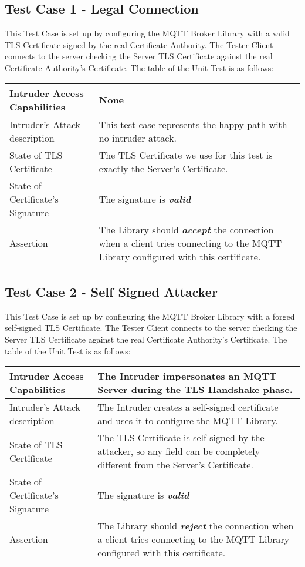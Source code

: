\documentclass[binding=0.6cm,noexaminfo]{sapthesis}
\begin{document}
\subsection{Test Case 1 - Legal Connection}
This Test Case is set up by configuring the MQTT Broker Library with a valid TLS Certificate signed by the real Certificate Authority. The Tester Client connects to the server checking the Server TLS Certificate against the real Certificate Authority’s Certificate. The table of the Unit Test is as follows:

\begin{center}
\begin{tabular}{| p{6cm} | p{6cm} |}
\hline
Intruder Access Capabilities & None \\
\hline
Intruder’s Attack description & This test case represents the happy path with no intruder attack. \\
\hline
State of TLS Certificate & The TLS Certificate we use for this test is exactly the Server’s Certificate. \\
\hline
State of Certificate’s Signature & The signature is \textbf{\textit{valid}} \\
\hline
Assertion & The Library should \textbf{\textit{accept}} the connection when a client tries connecting to the MQTT Library configured with this certificate. \\
\hline
\end{tabular}
\end{center}

\subsection{Test Case 2 - Self Signed Attacker}
This Test Case is set up by configuring the MQTT Broker Library with a forged self-signed TLS Certificate. The Tester Client connects to the server checking the Server TLS Certificate against the real Certificate Authority’s Certificate. The table of the Unit Test is as follows:

\begin{center}
\begin{tabular}{| p{6cm} | p{6cm} |}
\hline
Intruder Access Capabilities & The Intruder impersonates an MQTT Server during the TLS Handshake phase. \\
\hline
Intruder’s Attack description & The Intruder creates a self-signed certificate and uses it to configure the MQTT Library. \\
\hline
State of TLS Certificate & The TLS Certificate is self-signed by the attacker, so any field can be completely different from the Server’s Certificate. \\
\hline
State of Certificate’s Signature & The signature is \textbf{\textit{valid}} \\
\hline
Assertion & The Library should \textbf{\textit{reject}} the connection when a client tries connecting to the MQTT Library configured with this certificate. \\
\hline
\end{tabular}
\end{center}
\end{document}
